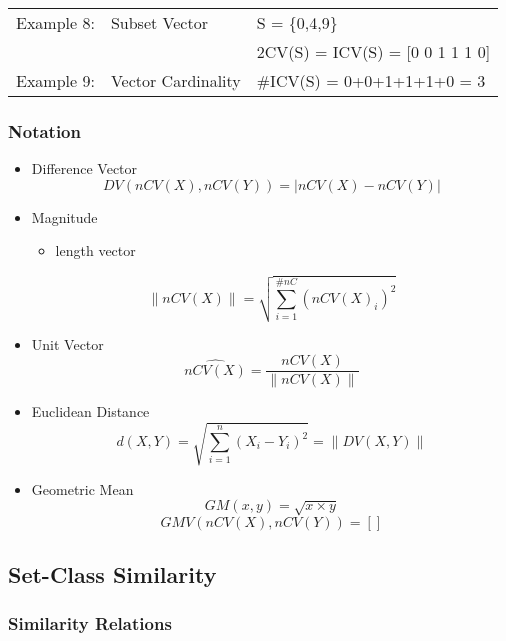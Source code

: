 \documentclass{article}
\begin{document}
\begin{center}
\begin{tabular}{lll}
 Example 8:  &  Subset Vector       &  S = \{0,4,9\}                    \\
             &                      &  2CV(S) = ICV(S) = [0 0 1 1 1 0]  \\
 Example 9:  &  Vector Cardinality  &  \#ICV(S) = 0+0+1+1+1+0 = 3       \\
\end{tabular}
\end{center}
\subsubsection{Notation}
\label{sec-3-3-4}
\begin{itemize}

\item Difference Vector\\
\label{sec-3-3-4-1}%
$$DV(nCV(X),nCV(Y))=\left|nCV(X)-nCV(Y)\right|$$

\item Magnitude
\label{sec-3-3-4-2}%
\begin{itemize}
\item length vector
\end{itemize}
$$\left\|nCV(X)\right\|=\sqrt{\sum_{i=1}^{\#nC}{(nCV(X)_{i})^{2}}}$$

\item Unit Vector\\
\label{sec-3-3-4-3}%
$$\hat{nCV(X)}=\frac{nCV(X)}{\left\|nCV(X)\right\|}$$

\item Euclidean Distance\\
\label{sec-3-3-4-4}%
$$d(X,Y)=\sqrt{\sum_{i=1}^{n}{(X_{i}-Y_{i})^{2}}}=\left\|DV(X,Y)\right\|$$

\item Geometric Mean\\
\label{sec-3-3-4-5}%
$$ GM(x,y)=\sqrt{x\times y}$$
$$ GMV(nCV(X),nCV(Y))=[ ]  $$
\end{itemize} %
\subsection{Set-Class Similarity}
\label{sec-3-4}
\subsubsection{Similarity Relations}
\label{sec-3-4-1}
\end{document}

